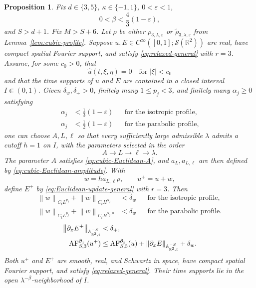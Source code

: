 \documentclass[12pt,reqno,letterpaper]{amsart}
\numberwithin{equation}{section}
\newtheorem{proposition}[theorem]{Proposition}
\theoremstyle{definition}
\newcommand{\R}{\mathbb R}
\newcommand{\A}{\mathbb A}
\newcommand{\eps}{\varepsilon}
\newcommand{\la}{\lambda}
\newcommand{\norm}[1]{\left\lVert #1\right\rVert}
\newcommand{\abs}[1]{\left\lvert #1\right\rvert}
\begin{document}
\begin{proposition}
\label{prop:cubic-Euclidean-onestep}
Fix $d\in\{3,5\}$, $\kappa\in\{-1,1\}$,
$0<\eps<1$,
\[
 0<\beta<\frac43(1-\eps),
\]
and $S>d+1$.  Fix $M>S+6$.
Let $\rho$ be either $\rho_{3,\la,\eps}$ or
$\widetilde{\rho}_{3,\la,\eps}$ from
Lemma~\ref{lem:cubic-profile}.
Suppose $u,E\in C^\infty([0,1];\mathcal S(\R^2))$ are real, have
compact spatial Fourier support, and satisfy
\eqref{eq:relaxed-general} with $r=3$.
Assume, for some $c_0>0$, that
\[
 \widehat u(t,\xi,\eta)=0\quad\text{for }\abs\xi<c_0
\]
and that the time supports of $u$ and $E$ are contained in a closed
interval $I\Subset(0,1)$.  Given $\delta_w,\delta_+>0$, finitely many
$1\leq p_j<3$, and finitely many $\alpha_j\geq0$ satisfying
\[
 \begin{aligned}
 \alpha_j&<\frac13(1-\eps)
 &&\text{for the isotropic profile},\\
 \alpha_j&<\frac12(1-\eps)
 &&\text{for the parabolic profile},
 \end{aligned}
\]
one can choose $A,L,\ell$ so that every sufficiently large admissible
$\la$ admits a cutoff $h=1$ on $I$, with the parameters selected in the
order
\[
 A\longrightarrow L\longrightarrow\ell\longrightarrow\la.
\]
The parameter $A$ satisfies
\eqref{eq:cubic-Euclidean-A}, and $a_L,a_{L,\ell}$ are then defined by
\eqref{eq:cubic-Euclidean-amplitude}.  With
\[
 w=h a_{L,\ell}\rho,\qquad u^+=u+w,
\]
define $E^+$ by \eqref{eq:Euclidean-update-general} with $r=3$.  Then
\begin{equation}\label{eq:cubic-Euclidean-onestep-regularity}
 \begin{aligned}
 \norm w_{C_tL^{p_j}}+\norm w_{C_tH^{\alpha_j}}&<\delta_w
 &&\text{for the isotropic profile},\\
 \norm w_{C_tL^{p_j}}+\norm w_{C_tH^{\alpha_j,0}}&<\delta_w
 &&\text{for the parabolic profile}.
 \end{aligned}
\end{equation}
\begin{align}
 \norm{\partial_xE^+}_{\A^{-S}_{\R^2,t}}&<\delta_+,
 \notag\\
 \operatorname{AF}^{\partial_x}_{S,3}(u^+)
 &\leq\operatorname{AF}^{\partial_x}_{S,3}(u)
 +\norm{\partial_xE}_{\A^{-S}_{\R^2,t}}+\delta_w.
 \label{eq:cubic-Euclidean-onestep-AF}
\end{align}
Both $u^+$ and $E^+$ are smooth, real, and Schwartz in space, have compact
spatial Fourier support, and satisfy \eqref{eq:relaxed-general}.
Their time supports lie in the open $\la^{-\beta}$-neighborhood of $I$.


\end{proposition}
\end{document}
